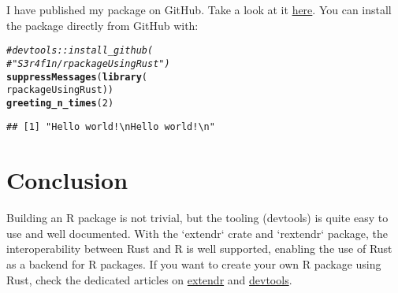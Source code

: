 \documentclass[twoside,twocolumn]{article}\usepackage[]{graphicx}\usepackage[dvipsnames]{xcolor}
\makeatletter
\newcommand{\hlnum}[1]{\textcolor[rgb]{0.686,0.059,0.569}{#1}}%
\newcommand{\hlcom}[1]{\textcolor[rgb]{0.678,0.584,0.686}{\textit{#1}}}%
\newcommand{\hlstd}[1]{\textcolor[rgb]{0.345,0.345,0.345}{#1}}%
\newcommand{\hlkwd}[1]{\textcolor[rgb]{0.737,0.353,0.396}{\textbf{#1}}}%
\newenvironment{kframe}{%
 \def\at@end@of@kframe{}%
 \ifinner\ifhmode%
  \def\at@end@of@kframe{\end{minipage}}%
  \begin{minipage}{\columnwidth}%
 \fi\fi%
 \def\FrameCommand##1{\hskip\@totalleftmargin \hskip-\fboxsep
 \colorbox{shadecolor}{##1}\hskip-\fboxsep
     \hskip-\linewidth \hskip-\@totalleftmargin \hskip\columnwidth}%
 \MakeFramed {\advance\hsize-\width
   \@totalleftmargin\z@ \linewidth\hsize
   \@setminipage}}%
 {\par\unskip\endMakeFramed%
 \at@end@of@kframe}
\newenvironment{knitrout}{}{} %
\makeatother
\begin{document}
I have published my package on GitHub. Take a look at it \href{https://github.com/S3r4f1n/rpackageUsingRust}{here}. You can install the package directly from GitHub with:
\begin{knitrout}
\color{fgcolor}\begin{kframe}
\begin{alltt}
\hlcom{# devtools::install_github(}
\hlcom{#    "S3r4f1n/rpackageUsingRust")}
\hlkwd{suppressMessages}\hlstd{(}\hlkwd{library}\hlstd{(}
    \hlstd{rpackageUsingRust))}
\hlkwd{greeting_n_times}\hlstd{(}\hlnum{2}\hlstd{)}
\end{alltt}
\begin{verbatim}
## [1] "Hello world!\nHello world!\n"
\end{verbatim}
\end{kframe}
\end{knitrout}

\section*{Conclusion}
Building an R package is not trivial, but the tooling (devtools) is quite easy to use and well documented. With the `extendr` crate and `rextendr` package, the interoperability between Rust and R is well supported, enabling the use of Rust as a backend for R packages. If you want to create your own R package using Rust, check the dedicated articles on \href{https://extendr.github.io/rextendr/articles/package.html}{extendr} and \href{https://rstudio.github.io/cheatsheets/html/package-development.html}{devtools}.
\end{document}
